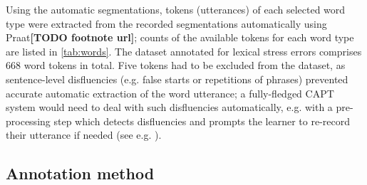 \documentclass[a4paper]{article}
\newcommand{\TODO}[1]{{\color{red}\textbf{[TODO #1]}}}
\begin{document}
	Using the automatic segmentations, tokens (utterances) of each selected word type were extracted from the recorded segmentations automatically using Praat\TODO{footnote url}; counts of the available tokens for each word type are listed in \cref{tab:words}. 
	The dataset annotated for lexical stress errors comprises 668 word tokens in total. Five tokens had to be excluded from the dataset, as sentence-level disfluencies (e.g. false starts or repetitions of phrases) prevented accurate automatic extraction of the word utterance; a fully-fledged CAPT system would need to deal with such disfluencies automatically, e.g. with a pre-processing step  which detects disfluencies and prompts the learner to re-record their utterance if needed 
	(see e.g. %
	\cite{Orosanu2012}).
		
		\subsection{Annotation method}
		\label{sec:data:annotation}	
		
\end{document}
